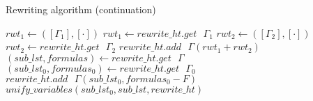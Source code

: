 \documentclass{article}
\begin{document}
\begin{algorithm}
  \caption{Rewriting algorithm (continuation)}
    \begin{algorithmic}
              \State $rwt_1 \gets \left([\Gamma_{1}], [\cdot]\right)$
            \Else
              \State $rwt_1 \gets rewrite\_ht.get \text{ } \Gamma_{1}$
            \EndIf
              \State $rwt_2 \gets \left([\Gamma_{2}], [\cdot]\right)$
            \Else
              \State $rwt_2 \gets rewrite\_ht.get \text{ } \Gamma_{2}$
            \EndIf
            \State $rewrite\_ht.add \text{ } \Gamma \left(rwt_1 + rwt_2\right)$
          \EndIf
        \EndIf
          \State $\left(sub\_lst, formulas\right) \gets rewrite\_ht.get \text{ } \Gamma$
          \State $\left(sub\_lst_0, formulas_0\right) \gets rewrite\_ht.get \text{ } \Gamma_{0}$ 
            \State $rewrite\_ht.add \text{ } \Gamma \left(sub\_lst_0, formulas_0 - F\right)$
          \Else
              \State $unify\_variables\left(sub\_lst_0, sub\_lst, rewrite\_ht\right)$
            \EndIf
          \EndIf
        \EndIf  
      \EndFor
    \EndIf
    \EndFor
    \EndFunction
\end{algorithmic}
\end{algorithm}
\end{document}
